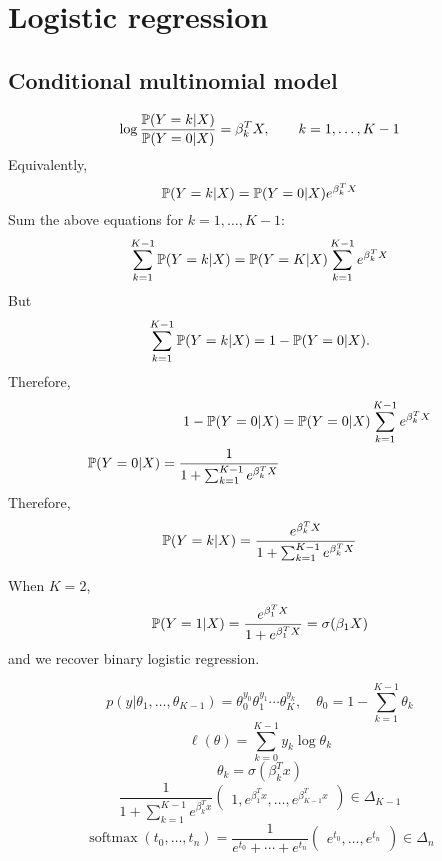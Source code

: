 \documentclass[12pt]{amsart}
\DeclareMathOperator{\softmax}{softmax}
\begin{document}
\section{Logistic regression}

\subsection{Conditional multinomial model}
\[
    \log\frac{\mathbb{P}(Y=k|X)}{\mathbb{P}(Y=0|X)} = \beta_k^T X,\qquad k=1,\ldots,K-1\\
\]
Equivalently,
\[
    \mathbb{P}(Y=k|X) = \mathbb{P}(Y=0|X) e^{\beta_k^T X}
\]
Sum the above equations for $k=1,\ldots,K-1$:
\[
    \sum_{k=1}^{K-1}\mathbb{P}(Y=k|X) = \mathbb{P}(Y=K|X) \sum_{k=1}^{K-1}e^{\beta_k^T X}
\]
But
\[
    \sum_{k=1}^{K-1}\mathbb{P}(Y=k|X) = 1 - \mathbb{P}(Y=0|X).
\]
Therefore,
\begin{align*}
    1 - \mathbb{P}(Y=0|X) &= \mathbb{P}(Y=0|X) \sum_{k=1}^{K-1}e^{\beta_k^T X}\\
\mathbb{P}(Y = 0|X) = \dfrac1{{1+\sum_{k=1}^{K-1}e^{\beta_k^T X}}}
\end{align*}
Therefore,
\[
    \mathbb{P}(Y=k|X) = \dfrac{e^{\beta_k^T X}}{{1+\sum_{k=1}^{K-1}e^{\beta_k^T X}}}
\]

When $K=2$,
\[
    \mathbb{P}(Y=1|X) = \dfrac{e^{\beta_1^T X}}{{1+e^{\beta_1^T X}}} = \sigma(\beta_1X)
\]
and we recover binary logistic regression.

\[
p(y|\theta_1,\ldots,\theta_{K-1}) 
= \theta_0^{y_0}\theta_1^{y_1}\cdots\theta_K^{y_k},
\quad \theta_0 = 1-\sum_{k=1}^{K-1}\theta_k
\]
\[
    \ell(\theta) = \sum_{k=0}^{K-1}y_k\log\theta_k
\]
\[
    \theta_k = \sigma(\beta_k^T x)
\]
\[
\dfrac1{{1+\sum_{k=1}^{K-1}e^{\beta_k^T x}}}\begin{pmatrix}
    1, e^{\beta_1^Tx},\ldots,e^{\beta_{K-1}^Tx}
\end{pmatrix}\in\Delta_{K-1}
\]
\[
    \softmax(t_0,\ldots,t_n) = \frac1{e^{t_0}+\cdots + e^{t_n}}
    \begin{pmatrix}
        e^{t_0},\ldots,e^{t_n}
    \end{pmatrix}\in\Delta_n
\]
\end{document}
